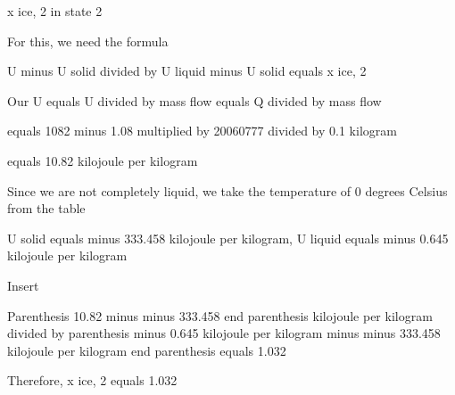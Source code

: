 x ice, 2 in state 2

For this, we need the formula

U minus U solid divided by U liquid minus U solid equals x ice, 2

Our U equals U divided by mass flow equals Q divided by mass flow

equals 1082 minus 1.08 multiplied by 20060777 divided by 0.1 kilogram

equals 10.82 kilojoule per kilogram

Since we are not completely liquid, we take the temperature of 0 degrees Celsius from the table

U solid equals minus 333.458 kilojoule per kilogram, U liquid equals minus 0.645 kilojoule per kilogram

Insert

Parenthesis 10.82 minus minus 333.458 end parenthesis kilojoule per kilogram divided by parenthesis minus 0.645 kilojoule per kilogram minus minus 333.458 kilojoule per kilogram end parenthesis equals 1.032

Therefore, x ice, 2 equals 1.032